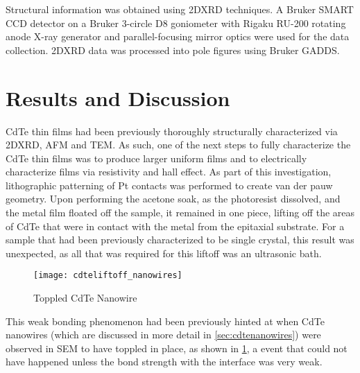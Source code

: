Structural information was obtained using 2DXRD techniques.
A Bru\-ker SMART CCD detector on a Bruker 3-circle D8 goniometer with Rigaku RU-200 rotating anode X-ray generator and parallel-focusing mirror optics were used for the data collection.
2DXRD data was processed into pole figures using Bruker GADDS.
\section{Results and Discussion}
CdTe thin films had been previously thoroughly structurally characterized via 2DXRD, AFM and TEM. As such, one of the next steps to fully characterize the CdTe thin films was to produce larger uniform films\cite{stephen-thesis} and to electrically characterize films via resistivity and hall effect.
As part of this investigation, lithographic patterning of Pt contacts was performed to create van der pauw geometry.
Upon performing the acetone soak, as the photoresist dissolved, and the metal film floated off the sample, it remained in one piece, lifting off the areas of CdTe that were in contact with the metal from the epitaxial substrate.
For a sample that had been previously characterized to be single crystal, this result was unexpected, as all that was required for this liftoff was an ultrasonic bath.
\begin{figure}
 \centering \texttt{[image: cdteliftoff\_nanowires]}
 \caption{\label{fig:cdteliftoff_nanowires}Toppled CdTe Nanowire}
\end{figure}
This weak bonding phenomenon had been previously hinted at when CdTe nanowires (which are discussed in more detail in \cref{sec:cdtenanowires}) were observed in SEM to have toppled in place, as shown in \cref{fig:cdteliftoff_nanowires}, a event that could not have happened unless the bond strength with the interface was very weak.


